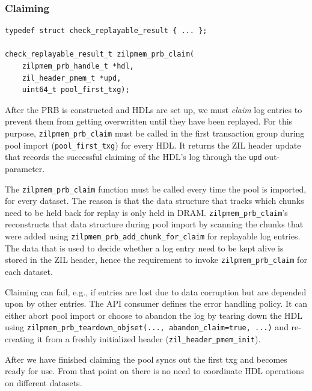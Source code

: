 \documentclass[12pt,a4paper,twoside]{book}
\begin{document}
\subsubsection{Claiming}

\begin{lstlisting}
typedef struct check_replayable_result { ... };

check_replayable_result_t zilpmem_prb_claim(
    zilpmem_prb_handle_t *hdl,
    zil_header_pmem_t *upd,
    uint64_t pool_first_txg);
\end{lstlisting}

After the PRB is constructed and HDLs are set up, we must \textit{claim} log entries to prevent them from getting overwritten until they have been replayed.
For this purpose, \lstinline{zilpmem_prb_claim} must be called in the first transaction group during pool import (\lstinline{pool_first_txg}) for every HDL.
It returns the ZIL header update that records the successful claiming of the HDL's log through the \lstinline{upd} out-parameter.

The \lstinline{zilpmem_prb_claim} function must be called every time the pool is imported, for every dataset.
The reason is that the data structure that tracks which chunks need to be held back for replay is only held in DRAM.
\lstinline{zilpmem_prb_claim}'s reconstructs that data structure during pool import by scanning the chunks that were added using \lstinline{zilpmem_prb_add_chunk_for_claim} for replayable log entries.
The data that is used to decide whether a log entry need to be kept alive is stored in the ZIL header, hence the requirement to invoke \lstinline{zilpmem_prb_claim} for each dataset.

Claiming can fail, e.g., if entries are lost due to data corruption but are depended upon by other entries.
The API consumer defines the error handling policy.
It can either abort pool import or choose to abandon the log by tearing down the HDL using \lstinline{zilpmem_prb_teardown_objset(..., abandon_claim=true, ...)} and re-creating it from a freshly initialized header (\lstinline{zil_header_pmem_init}).

After we have finished claiming the pool syncs out the first txg and becomes ready for use.
From that point on there is no need to coordinate HDL operations on different datasets.
\end{document}
